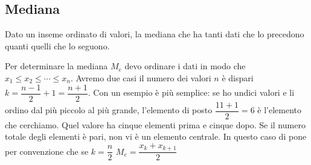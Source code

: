\subsection{Mediana}
\begin{defn}[Mediana]
Dato un inseme ordinato di valori, la mediana che ha tanti dati che lo precedono quanti quelli che lo seguono.
\end{defn}
Per determinare la mediana $M_e$ devo ordinare i dati in modo che $x_1\leq x_2\leq\cdots\leq x_n $. Avremo due casi il numero dei valori $n$ è dispari $k=\dfrac{n-1}{2}+1=\dfrac{n+1}{2}$. Con un esempio è più semplice: se ho undici valori e li ordino dal più piccolo al più grande, l'elemento di posto $ \dfrac{11+1}{2}=6$ è l'elemento che cerchiamo. Quel valore ha cinque elementi prima e cinque dopo. Se il numero totale  degli elementi è pari, non vi è un elemento centrale. In questo caso di pone per convenzione che se $k=\dfrac{n}{2}$ $M_e=\dfrac{x_k+x_{k+1}}{2}$